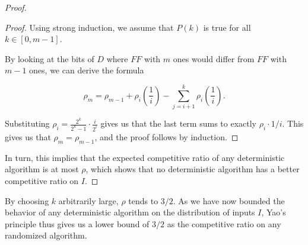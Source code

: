 \begin{proof}
\begin{proof}
Using strong induction, we assume that $P(k)$ is true for all $k \in [0,m-1]$.





By looking at the bits of $D$ where $FF$ with $m$ ones would differ from $FF$ with $m-1$ ones, we can derive the formula

\[\rho_m = \rho_{m-1} + \rho_i\left(\frac{1}{i}\right) - \sum_{j=i+1}^k \rho_i\left(\frac{1}{i}\right).\]

Substituting $\rho_i = \frac{2^k}{2^k-1}\cdot\frac{i}{2^i}$ gives us that the last term sums to exactly $\rho_i \cdot 1/i$.  This gives us that $\rho_m = \rho_{m-1}$, and the proof follows by induction.
\end{proof}

In turn, this implies that the expected competitive ratio of any deterministic algorithm is at most $\rho$, which shows that no deterministic algorithm has a better competitive ratio on $I$.
\end{proof}

By choosing $k$ arbitrarily large, $\rho$ tends to $3/2$. As we have now bounded the behavior of any deterministic algorithm on the distribution of inputs $I$, Yao's principle thus gives us a lower bound of $3/2$ as the competitive ratio on any randomized algorithm.

